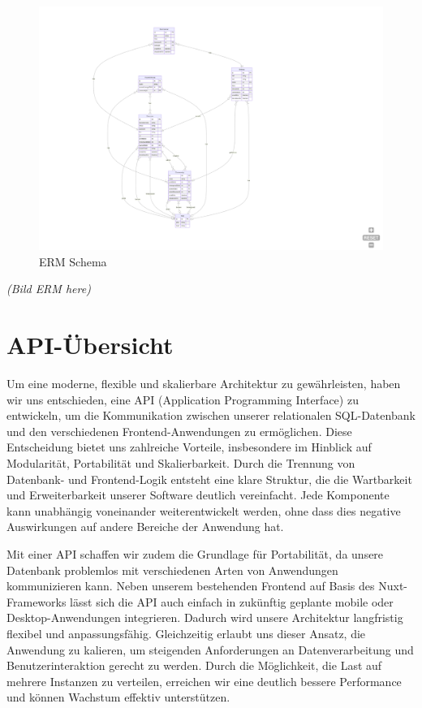 \documentclass[a4paper,12pt]{article}
\begin{document}
\begin{figure}[p]
	\centering
	\includegraphics[scale=.5]{"ERM"}
	\caption{ERM Schema}
	\label{fig:ERM}
\end{figure}
\textit{(Bild ERM here)}

\newpage

\section{API-Übersicht}

Um eine moderne, flexible und skalierbare Architektur zu gewährleisten, haben
wir uns entschieden, eine API (Application Programming Interface) zu
entwickeln, um die Kommunikation zwischen unserer relationalen SQL-Datenbank
und den verschiedenen Frontend-Anwendungen zu ermöglichen. Diese Entscheidung
bietet uns zahlreiche Vorteile, insbesondere im Hinblick auf Modularität,
Portabilität und Skalierbarkeit. Durch die Trennung von Datenbank- und
Frontend-Logik entsteht eine klare Struktur, die die Wartbarkeit und
Erweiterbarkeit unserer Software deutlich vereinfacht. Jede Komponente kann
unabhängig voneinander weiterentwickelt werden, ohne dass dies negative
Auswirkungen auf andere Bereiche der Anwendung hat.

Mit einer API schaffen wir zudem die Grundlage für Portabilität, da unsere
Datenbank problemlos mit verschiedenen Arten von Anwendungen kommunizieren
kann. Neben unserem bestehenden Frontend auf Basis des Nuxt-Frameworks lässt
sich die API auch einfach in zukünftig geplante mobile oder Desktop-Anwendungen
integrieren. Dadurch wird unsere Architektur langfristig flexibel und
anpassungsfähig. Gleichzeitig erlaubt uns dieser Ansatz, die Anwendung zu
kalieren, um steigenden Anforderungen an Datenverarbeitung und
Benutzerinteraktion gerecht zu werden. Durch die Möglichkeit, die Last auf
mehrere Instanzen zu verteilen, erreichen wir eine deutlich bessere Performance
und können Wachstum effektiv unterstützen.
\end{document}
